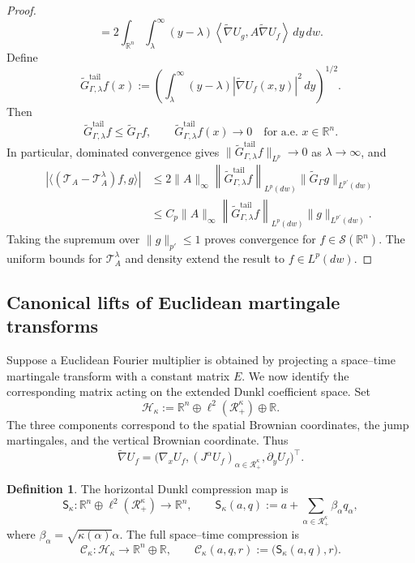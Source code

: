 \documentclass[11pt]{amsart}
\theoremstyle{definition}
\newtheorem{definition}[theorem]{Definition}
\theoremstyle{remark}
\numberwithin{equation}{section}
\newcommand{\R}{\mathbb{R}}
\newcommand{\RR}{\mathcal{R}}
\begin{document}
\begin{proof}
\[=
2\int_{\R^n}\int_\lambda^\infty
(y-\lambda)\left\langle\widetilde\nabla U_g,A\widetilde\nabla U_f\right\rangle
\,dy\,dw.
\]
Define
\[
\widetilde G_{\Gamma,\lambda}^{\mathrm{tail}}f(x)
:=
\left(\int_\lambda^\infty
(y-\lambda)|\widetilde\nabla U_f(x,y)|^2\,dy\right)^{1/2}.
\]
Then
\[
\widetilde G_{\Gamma,\lambda}^{\mathrm{tail}}f\leq\widetilde G_\Gamma f,
\qquad
\widetilde G_{\Gamma,\lambda}^{\mathrm{tail}}f(x)\longrightarrow0
\quad\text{for a.e. }x\in\R^n.
\]
In particular, dominated convergence gives
$\|\widetilde G_{\Gamma,\lambda}^{\mathrm{tail}}f\|_{L^p}\to0$
as $\lambda\to\infty$, and
\begin{align*}
|\langle(\mathcal T_A-\mathcal T_A^\lambda)f,g\rangle|
&\leq
2\|A\|_\infty
\left\|\widetilde G_{\Gamma,\lambda}^{\mathrm{tail}}f\right\|_{L^p(dw)}
\|\widetilde G_\Gamma g\|_{L^{p'}(dw)}\\
&\leq
C_p\|A\|_\infty
\left\|\widetilde G_{\Gamma,\lambda}^{\mathrm{tail}}f\right\|_{L^p(dw)}
\|g\|_{L^{p'}(dw)}.
\end{align*}
Taking the supremum over $\|g\|_{p'}\leq1$ proves convergence for $f\in\mathcal S(\R^n)$. The uniform bounds for $\mathcal T_A^\lambda$ and density extend the result to $f\in L^p(dw)$.
\end{proof}

\subsection{Canonical lifts of Euclidean martingale transforms}

Suppose a Euclidean Fourier multiplier is obtained by projecting a space--time martingale transform with a constant matrix $E$. We now identify the corresponding matrix acting on the extended Dunkl coefficient space. Set
\[
\mathcal H_\kappa
:=\R^n\oplus\ell^2(\RR_+^\kappa)\oplus\R.
\]
The three components correspond to the spatial Brownian coordinates, the jump martingales, and the vertical Brownian coordinate. Thus
\[
\widetilde\nabla U_f
=
\bigl(\nabla_xU_f,(J^\alpha U_f)_{\alpha\in\RR_+^\kappa},\partial_yU_f\bigr)^\top.
\]

\begin{definition}
The horizontal Dunkl compression map is
\[
\mathsf S_\kappa:
\R^n\oplus\ell^2(\RR_+^\kappa)\longrightarrow\R^n,
\qquad
\mathsf S_\kappa(a,q)
:=a+\sum_{\alpha\in\RR_+^\kappa}\beta_\alpha q_\alpha,
\]
where $\beta_\alpha=\sqrt{\kappa(\alpha)}\alpha$. The full space--time compression is
\[
\mathcal C_\kappa:\mathcal H_\kappa\longrightarrow\R^n\oplus\R,
\qquad
\mathcal C_\kappa(a,q,r):=\bigl(\mathsf S_\kappa(a,q),r\bigr).
\]
\end{definition}
\end{document}
